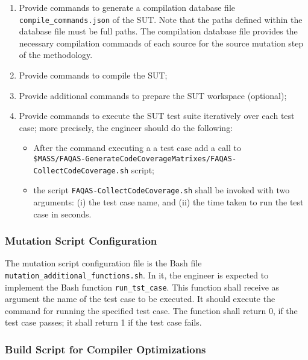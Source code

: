 \begin{enumerate}
	\item Provide commands to generate a compilation database file \texttt{compile\_commands.json} of the SUT. Note that the paths defined within the database file must be full paths. The compilation database file provides the necessary compilation commands of each source for the source mutation step of the methodology.
	\item Provide commands to compile the SUT;
	\item Provide additional commands to prepare the SUT workspace (optional);
	\item Provide commands to execute the SUT test suite iteratively over each test case; more precisely, the engineer should do the following:
	\begin{itemize}
		\item After the command executing a a test case add a call to \\\texttt{\$MASS/FAQAS-GenerateCodeCoverageMatrixes/FAQAS-CollectCodeCoverage.sh} script;
		\item the script \texttt{FAQAS-CollectCodeCoverage.sh} shall be invoked with two arguments: (i) the test case name, and (ii) the time taken to run the test case in seconds.
	\end{itemize}
\end{enumerate}

\subsubsection{Mutation Script Configuration}

The mutation script configuration file is the Bash file \texttt{mutation\_additional\_functions.sh}. In it, the engineer is expected to implement the Bash function \texttt{run\_tst\_case}.
This function shall receive as argument the name of the test case to be executed. It should execute the command for running the specified test case. 
The function shall return 0, if the test case passes; it shall return 1 if the test case fails.


\subsubsection{Build Script for Compiler Optimizations}

